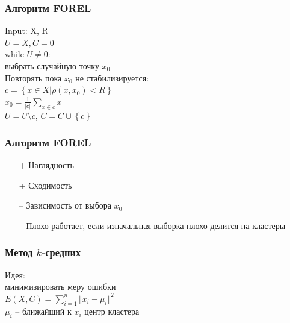 \documentclass[12pt]{beamer}
\begin{document}
\begin{frame}\frametitle{Алгоритм FOREL}
Input: X, R\\
${U = X, C = 0}$\\\vspace{2mm}
while ${U \neq 0}$:\\
\hspace{5mm} выбрать случайную точку $x_0$\\
\vspace{2mm}
\hspace{5mm} Повторять пока $x_0$ не стабилизируется:\\
\vspace{2mm}
\hspace{10mm} ${c = \left\{ x \in X \vert \rho(x, x_0) < R \right\}}$ \\
\vspace{2mm}
\hspace{10mm} $x_0 = \frac{1}{\vert c \vert} \sum\limits_{x \in c} x$\\
\vspace{2mm}
\hspace{5mm} ${U = U \setminus c}$, ${C = C \cup \left\{ c \right\}}$
\end{frame}

\begin{frame}\frametitle{Алгоритм FOREL}

\begin{itemize}
\item[+] Наглядность
\item[+] Сходимость
\item[--] Зависимость от выбора $x_0$
\item[--] Плохо работает, если изначальная выборка плохо делится на кластеры
\end{itemize}

\end{frame}

\begin{frame}\frametitle{Метод $k$-средних}
Идея:\\  минимизировать меру ошибки\\
\vspace{5mm}${E(X, C) = \sum\limits_{i = 1}^n \Vert x_i -\mu_i \Vert^2}$\\
\vspace{5mm}
$\mu_i$ -- ближайший к $x_i$ центр кластера
\end{frame}
\end{document}
